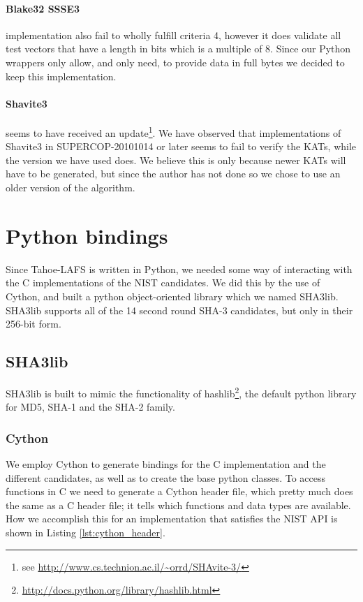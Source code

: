 \documentclass[english,12pt,a4paper]{book}
\begin{document}
\paragraph{Blake32 \ac{SSSE3}} implementation also fail to wholly fulfill
criteria 4, however it does validate all test vectors that have a length 
in bits which is a multiple of 8. Since our Python wrappers only allow, and
only need, to provide data in full bytes we decided to keep this
implementation.

\paragraph{Shavite3} seems to have received an update\footnote{see
\url{http://www.cs.technion.ac.il/~orrd/SHAvite-3/}}. We have observed that
implementations of Shavite3 in \ac{SUPERCOP}-20101014 or later seems to fail to
verify the \ac{KAT}s, while the version we have used does. We believe this is
only because newer \ac{KAT}s will have to be generated, but since the author
has not done so we chose to use an older version of the algorithm.



\section{Python bindings}

Since Tahoe-\ac{LAFS} is written in Python, we needed some way of interacting
with the C implementations of the NIST candidates. We did this by the use of
Cython, and built a python object-oriented library which we named SHA3lib.
SHA3lib supports all of the 14 second round \ac{SHA}-3 candidates, but only in
their 256-bit form.

\subsection{SHA3lib}
SHA3lib is built to mimic the functionality of
hashlib\footnote{\url{http://docs.python.org/library/hashlib.html}}, the
default python library for MD5, \ac{SHA}-1 and the \ac{SHA}-2 family. 

\subsubsection{Cython}
We employ Cython to generate bindings for the C implementation and the
different candidates, as well as to create the base python classes. To access
functions in C we need to generate a Cython header file, which pretty much does
the same as a C header file; it tells which functions and data types are
available. How we accomplish this for an implementation that satisfies the
\ac{NIST} \ac{API} is shown in Listing \ref{lst:cython_header}. 
\end{document}
